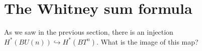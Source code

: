 \section{The Whitney sum formula}
%
%
%
%
%
As we saw in the previous section, there is an injection
$H^\ast(BU(n))\hookrightarrow H^\ast(BT^n)$. What is the image of this map?

